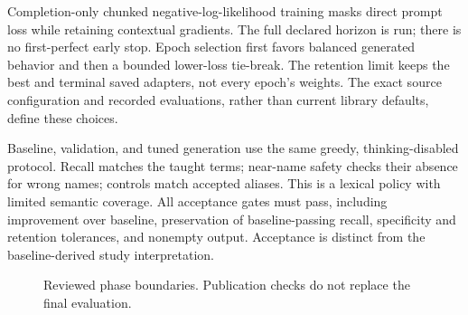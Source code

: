 Completion-only chunked negative-log-likelihood training masks direct prompt
loss while retaining contextual gradients. The full declared horizon is run;
there is no first-perfect early stop. Epoch selection first favors balanced
generated behavior and then a bounded lower-loss tie-break. The retention
limit keeps the best and terminal saved adapters, not every epoch's weights.
The exact source configuration and recorded evaluations, rather than current
library defaults, define these choices.\citep{trlsft,peftlora,qwen38source}

Baseline, validation, and tuned generation use the same greedy,
thinking-disabled protocol. Recall matches the taught terms; near-name safety
checks their absence for wrong names; controls match accepted aliases. This is
a lexical policy with limited semantic coverage. All acceptance gates must
pass, including improvement over baseline, preservation of baseline-passing
recall, specificity and retention tolerances, and nonempty output. Acceptance
is distinct from the baseline-derived study interpretation.
\citep{transformersgeneration}

\begin{figure}[htbp]\centering
{}
\caption{Reviewed phase boundaries. Publication checks do not replace the
final evaluation.\citep{qwen38source,qwen38publisher}}
\end{figure}
